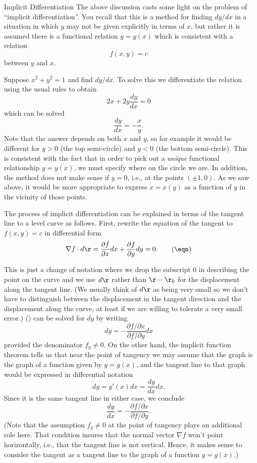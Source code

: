\subhead Implicit Differentiation \endsubhead
The above discussion casts some light on the problem of
``implicit differentiation''.  You recall that this is
a method for finding $dy/dx$ in a situation in which
$y$ may not be given explicitly in terms of $x$, but
rather it is assumed there is a functional
relation $y = y(x)$ which is consistent with a relation
$$
    f(x,y) = c
$$
between $y$ and $x$.
%

\nextex
{}   Suppose $x^2 + y^2 = 1$ and find
$dy/dx$.  To solve this we differentiate the relation using
the usual rules to obtain
$$
    2x + 2y\frac{dy}{dx} = 0
$$
which can be solved 
$$
    \frac{dy}{dx} = -\frac xy.
$$
Note that the answer depends on both $x$ and $y$, so for example
it would be different for $y > 0$ (the top semi-circle) and
$y < 0$ (the bottom semi-circle).  This is consistent with the
fact that in order to pick out a {\it unique\/} functional
relationship $y = y(x)$, we must specify where on the circle
we are.  In addition, the method does not make sense if $y = 0$,
i.e., at the points $(\pm 1, 0)$.  As we saw above, it would
be more appropriate to express $x = x(y)$ as a function of $y$
in the vicinity of those points.
\endexample

The process of implicit differentiation can be explained in
terms of the tangent line to a level curve as follows.  First,
rewrite the equation of the tangent to $f(x,y) = c$ in
differential form
\nexteqn
$$
   \nabla f\cdot d\r = \frac{\partial f}{\partial x} dx
      +
   \frac{\partial f}{\partial y} dy = 0.\tag\eqn
$$
\medskip
\centerline{}
\medskip
This is just a change of notation where we drop the subscript
$0$ in describing the point on the curve and we use
$d\r$ rather than $\r - \r_0$ for the displacement along
the tangent line.  (We usually think of $d\r$ as being very small
so we don't have to distinguish between the displacement in
the tangent direction and the displacement along the curve,
at least if we are willing to tolerate a very small error.)
(\eqn) can be solved for $dy$ by writing
$$
    dy  =  - \frac{\partial f/\partial x}  {\partial f/\partial y} dx
$$
provided the denominator $f_y \ne 0$.  On the other hand, the
implicit function theorem tells us that near the point of tangency
we may assume that the graph is the graph of a function
given by $y = g(x)$, and the tangent line to that graph would
be expressed in differential notation
$$
    dy = g'(x) dx = \frac{dy}{dx} dx.
$$
Since it is the same tangent line in either case, we conclude
\nexteqn
\xdef\EqImpTwo{\eqn}
$$
    \frac{dy}{dx} = 
  - \frac{\partial f/\partial x} 
   {\partial f/\partial y}.
$$
(Note that the assumption $f_y \ne 0$ at the point of tangency
plays an additional role here.  That condition insures that the
normal vector $\nabla f$ won't point horizontally, i.e., that
the tangent line is not vertical.  Hence, it makes sense to
consider the tangent as a tangent line to the graph of a function
$y = g(x)$.) 

